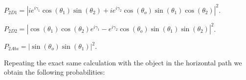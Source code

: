 \documentclass[11pt]{article}
\begin{document}
\vspace{9 cm}

$P_{2D1}=|ie^{i\gamma_{1}}\cos(\theta_{1})\sin(\theta_{2})+i e^{i\gamma_{2}}\cos(\theta_{o}) \sin(\theta_{1})\cos(\theta_{2})|^2$.

\vspace{0.1cm}

$P_{2D2}=|\cos(\theta_{1})\cos(\theta_{2})e^{i\gamma_{1}}- e^{i\gamma_{2}}\cos(\theta_{o}) \sin(\theta_{1})\sin(\theta_{2})|^2$.

\vspace{0.1cm}

$P_{2Abs}=|\sin(\theta_{o}) \sin(\theta_{1})|^2$.

\vspace{0.3cm}

Repeating the exact same calculation with the object in the horizontal path we obtain the following probabilities:
\end{document}
